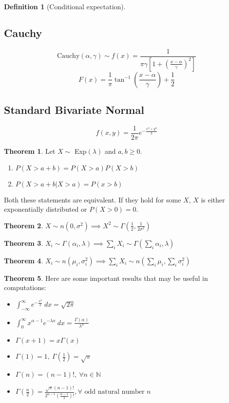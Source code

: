 \documentclass[10pt, a4paper]{extarticle}
\theoremstyle{definition}
\newtheorem{thm}{Theorem}
\newtheorem{defn}{Definition}
\begin{document}
\begin{defn}[Conditional expectation]
	\subsection{Cauchy}
	\[\text{Cauchy}(\alpha,\gamma)\sim f(x)=\frac{1}{\pi\gamma\left[1+\left(\frac{x-\alpha}{\gamma}\right)^2\right]}\]
	\[F(x)=\frac{1}{\pi}\tan^{-1}\left(\frac{x-\alpha}{\gamma}\right)+\frac{1}{2}\]

	\subsection{Standard Bivariate Normal}
	\[f(x,y)=\frac{1}{2\pi}e^{-\frac{x^2+y^2}{2}}\]

	\begin{thm}
		Let $X\sim$ Exp$(\lambda)$ and $a,b\geq 0$.
		\begin{enumerate}
			\item $P(X>a+b)=P(X>a)P(X>b)$
			\item $P(X>a+b|X>a)=P(x>b)$
	\end{enumerate}
	Both these statements are equivalent. If they hold for some $X$, $X$ is either exponentially distributed or $P(X>0)=0$.
	\end{thm}

	\begin{thm}
		$X\sim n(0,\sigma^2)\implies X^2\sim \Gamma\left(\frac{1}{2},\frac{1}{2\sigma^2}\right)$
	\end{thm}

	\begin{thm}
		$X_i\sim\Gamma(\alpha_i,\lambda)\implies \sum_iX_i\sim \Gamma(\sum_i\alpha_i,\lambda)$
	\end{thm}

	\begin{thm}
		$X_i\sim n(\mu_i,\sigma_i^2)\implies \sum_iX_i\sim n(\sum_i\mu_i,\sum_i\sigma_i^2)$
	\end{thm}

	\begin{thm}
		Here are some important results that may be useful in computations:
		\begin{itemize}
			\item $\int_{-\infty}^{\infty}e^{-\frac{x^2}{2}}\ dx=\sqrt{2\pi}$
			\item $\int_0^{\infty} x^{\alpha-1}e^{-\lambda x}\ dx=\frac{\Gamma(\alpha)}{\lambda^\alpha}$
			\item $\Gamma(x+1)=x\Gamma(x)$
			\item $\Gamma(1)=1,\ \Gamma\left(\frac{1}{2}\right)=\sqrt{\pi}$
			\item $\Gamma(n)=(n-1)!,\ \forall n\in\mathbb{N}$
			\item $\Gamma\left(\frac{n}{2}\right)=\frac{\sqrt{\pi}(n-1)!}{2^{n-1}\left(\frac{n-1}{2}\right)!}, \forall \text{ odd natural number }n$
		\end{itemize}
	\end{thm}



\end{defn}
\end{document}
